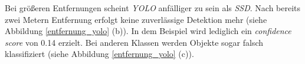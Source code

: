 Bei größeren Entfernungen scheint \textit{YOLO} anfälliger zu sein als \textit{SSD}. Nach bereits zwei Metern Entfernung erfolgt keine zuverlässige Detektion mehr (siehe Abbildung \ref{entfernung_yolo} (b)). In dem Beispiel wird lediglich ein \textit{confidence score} von 0.14 erzielt. Bei anderen Klassen werden Objekte sogar falsch klassifiziert (siehe Abbildung \ref{entfernung_yolo} (c)).

\begin{figure}[H]
	\hfill
	\hfill
	\hfill
	\hfill

\end{figure}

